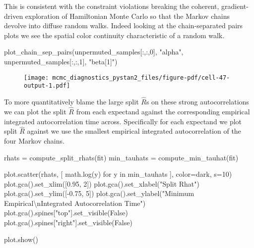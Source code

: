 \documentclass[
  letterpaper,
  DIV=11,
  numbers=noendperiod]{scrartcl}
\newenvironment{Shaded}{\begin{snugshade}}{\end{snugshade}}
\newcommand{\CharTok}[1]{\textcolor[rgb]{0.13,0.47,0.30}{#1}}
\newcommand{\ControlFlowTok}[1]{\textcolor[rgb]{0.00,0.23,0.31}{#1}}
\newcommand{\DecValTok}[1]{\textcolor[rgb]{0.68,0.00,0.00}{#1}}
\newcommand{\FloatTok}[1]{\textcolor[rgb]{0.68,0.00,0.00}{#1}}
\newcommand{\KeywordTok}[1]{\textcolor[rgb]{0.00,0.23,0.31}{#1}}
\newcommand{\NormalTok}[1]{\textcolor[rgb]{0.00,0.23,0.31}{#1}}
\newcommand{\OperatorTok}[1]{\textcolor[rgb]{0.37,0.37,0.37}{#1}}
\newcommand{\StringTok}[1]{\textcolor[rgb]{0.13,0.47,0.30}{#1}}
\newcommand{\VariableTok}[1]{\textcolor[rgb]{0.07,0.07,0.07}{#1}}
\begin{document}
This is consistent with the constraint violations breaking the coherent,
gradient-driven exploration of Hamiltonian Monte Carlo so that the
Markov chains devolve into diffuse random walks. Indeed looking at the
chain-separated pairs plots we see the spatial color continuity
characteristic of a random walk.

\begin{Shaded}
\begin{Highlighting}[]
\NormalTok{plot\_chain\_sep\_pairs(unpermuted\_samples[:,:,}\DecValTok{0}\NormalTok{], }\StringTok{"alpha"}\NormalTok{, }
\NormalTok{                     unpermuted\_samples[:,:,}\DecValTok{1}\NormalTok{], }\StringTok{"beta[1]"}\NormalTok{)}
\end{Highlighting}
\end{Shaded}

\begin{figure}[H]

{\centering \texttt{[image: mcmc\_diagnostics\_pystan2\_files/figure-pdf/cell-47-output-1.pdf]}

}

\end{figure}

To more quantitatively blame the large split \(\hat{R}\)s on these
strong autocorrelations we can plot the split \(\hat{R}\) from each
expectand against the corresponding empirical integrated autocorrelation
time across. Specifically for each expectand we plot split \(\hat{R}\)
against we use the smallest empirical integrated autocorrelation of the
four Markov chains.

\begin{Shaded}
\begin{Highlighting}[]
\NormalTok{rhats }\OperatorTok{=}\NormalTok{ compute\_split\_rhats(fit)}
\NormalTok{min\_tauhats }\OperatorTok{=}\NormalTok{ compute\_min\_tauhat(fit)}

\NormalTok{plot.scatter(rhats, [ math.log(y) }\ControlFlowTok{for}\NormalTok{ y }\KeywordTok{in}\NormalTok{ min\_tauhats ], color}\OperatorTok{=}\NormalTok{dark, s}\OperatorTok{=}\DecValTok{10}\NormalTok{)}
\NormalTok{plot.gca().set\_xlim([}\FloatTok{0.95}\NormalTok{, }\DecValTok{2}\NormalTok{])}
\NormalTok{plot.gca().set\_xlabel(}\StringTok{"Split Rhat"}\NormalTok{)}
\NormalTok{plot.gca().set\_ylim([}\OperatorTok{{-}}\FloatTok{0.75}\NormalTok{, }\DecValTok{5}\NormalTok{])}
\NormalTok{plot.gca().set\_ylabel(}\StringTok{"Minimum Empirical}\CharTok{\textbackslash{}n}\StringTok{Integrated Autocorrelation Time"}\NormalTok{)}
\NormalTok{plot.gca().spines[}\StringTok{"top"}\NormalTok{].set\_visible(}\VariableTok{False}\NormalTok{)}
\NormalTok{plot.gca().spines[}\StringTok{"right"}\NormalTok{].set\_visible(}\VariableTok{False}\NormalTok{)}

\NormalTok{plot.show()}
\end{Highlighting}
\end{Shaded}
\end{document}
